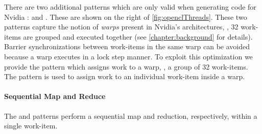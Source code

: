 There are two additional patterns which are only valid when generating code for Nvidia \GPUs:
\mapWarp and \mapLane.
These are shown on the right of \autoref{fig:openclThreads}.
These two patterns capture the notion of \emph{warps} present in Nvidia's \GPU architectures, \ie, 32 work-items are grouped and executed together (see \autoref{chapter:background} for details).
Barrier synchronizations between work-items in the same warp can be avoided because a warp executes in a lock step manner.
To exploit this optimization we provide the \mapWarp pattern which assigns work to a warp, \ie, a group of 32 work-items.
The \mapLane pattern is used to assign work to an individual work-item inside a warp.



\paragraph{Sequential Map and Reduce}
The \mapSeq and \reduceSeq patterns perform a sequential map and reduction, respectively, within a single work-item.


